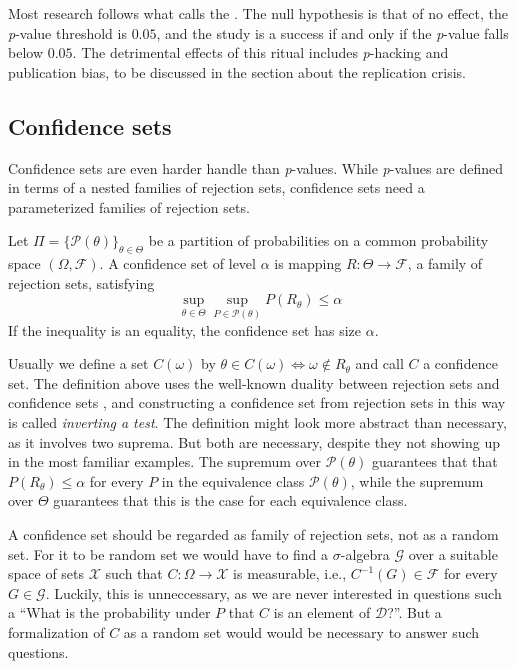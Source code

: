 Most research follows what \textcite{Gigerenzer2004-oc} calls the . The null hypothesis is that of no effect, the \textit{p}-value threshold is $0.05$, and the study is a success if and only if the \textit{p}-value falls below $0.05$. The detrimental effects of this ritual includes \textit{p}-hacking and publication bias, to be discussed in the section about the replication crisis.

\subsection{Confidence sets}
Confidence sets are even harder handle than \textit{p}-values. While
\textit{p}-values are defined in terms of a nested families of rejection
sets, confidence sets need a parameterized families of rejection sets. 
\begin{definition}
\label{def:confidence sets}Let $\Pi=\{\mathcal{P}(\theta)\}_{\theta\in\Theta}$
be a partition of probabilities on a common probability space $(\Omega,\mathcal{F})$.
A confidence set of level $\alpha$ is mapping $R:\Theta\to\mathcal{F}$,
a family of rejection sets, satisfying 
\begin{equation}
\sup_{\theta\in\Theta}\sup_{P\in\mathcal{P}(\theta)}P(R_{\theta})\leq\alpha\label{eq:confidence set}
\end{equation}
If the inequality is an equality, the confidence set has size $\alpha$. 
\end{definition}

Usually we define a set $C(\omega)$ by $\theta\in C(\omega)\iff\omega\notin R_{\theta}$ and call $C$ a confidence set. The definition above uses the well-known duality between rejection sets and confidence sets \parencite[Section 3.5]{Lehmann2005-sp}, and constructing a confidence set from rejection sets in this way is called
\emph{inverting a test}. The definition might look more abstract than necessary, as it involves two suprema. But both are necessary, despite they not showing up in the most familiar examples. The supremum over $\mathcal{P}(\theta)$ guarantees that that $P(R_{\theta})\leq\alpha$
for every $P$ in the equivalence class $\mathcal{P}(\theta)$, while
the supremum over $\Theta$ guarantees that this is the case for each equivalence class.

A confidence set should be regarded as family of rejection sets, not as a random set. For it to be random set we would have to find a $\sigma$-algebra $\mathcal{G}$ over a suitable space of sets $\mathcal{X}$ such that $C:\Omega\to\mathcal{X}$ is measurable, i.e., $C^{-1}(G)\in\mathcal{F}$ for every $G\in\mathcal{G}$. Luckily, this is unneccessary, as we are never interested in questions such a ``What is the probability under $P$ that $C$ is an element of $\mathcal{D}$?''. But a formalization of $C$ as a random set would would be necessary to answer such questions.

